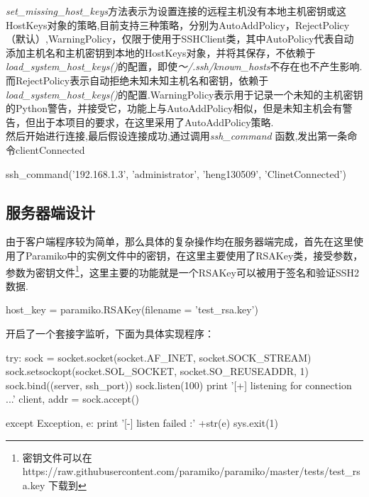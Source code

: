 \documentclass[UTF8,nofonts,a4paper]{ctexart}
\begin{document}
\indent \textit{set\_missing\_host\_keys}方法表示为设置连接的远程主机没有本地主机密钥或这HostKeys对象的策略,目前支持三种策略，分别为AutoAddPolicy，RejectPolicy（默认）,WarningPolicy，仅限于使用于SSHClient类，其中AutoPolicy代表自动添加主机名和主机密钥到本地的HostKeys对象，并将其保存，不依赖于\textit{load\_system\_host\_keys()}的配置，即使\textit{～/.ssh/known\_hosts}不存在也不产生影响.而RejectPolicy表示自动拒绝未知未知主机名和密钥，依赖于\textit{load\_system\_host\_keys()}的配置.WarningPolicy表示用于记录一个未知的主机密钥的Python警告，并接受它，功能上与AutoAddPolicy相似，但是未知主机会有警告，但出于本项目的要求，在这里采用了AutoAddPolicy策略.\\
\indent 然后开始进行连接,最后假设连接成功,通过调用\textit{ssh\_command} 函数,发出第一条命令clientConnected
\begin{python}
ssh_command('192.168.1.3', 'administrator', 'heng130509', 'ClinetConnected')
\end{python}

\subsection{服务器端设计}
由于客户端程序较为简单，那么具体的复杂操作均在服务器端完成，首先在这里使用了Paramiko中的实例文件中的密钥，在这里主要使用了RSAKey类，接受参数，参数为密钥文件\footnote{密钥文件可以在https://raw.githubusercontent.com/paramiko/paramiko/master/tests/test\_rsa.key 下载到}，这里主要的功能就是一个RSAKey可以被用于签名和验证SSH2数据.

\begin{python}
host_key = paramiko.RSAKey(filename = 'test_rsa.key')
\end{python}

\indent 开启了一个套接字监听，下面为具体实现程序：
\begin{python}
try:
	sock = socket.socket(socket.AF_INET, socket.SOCK_STREAM)
	sock.setsockopt(socket.SOL_SOCKET, socket.SO_REUSEADDR, 1)
	sock.bind((server, ssh_port))
	sock.listen(100)
	print '[+] listening for connection ...'
	client, addr = sock.accept()

except Exception, e:
	print '[-] listen failed :' +str(e)
	sys.exit(1)
\end{python}
\end{document}
